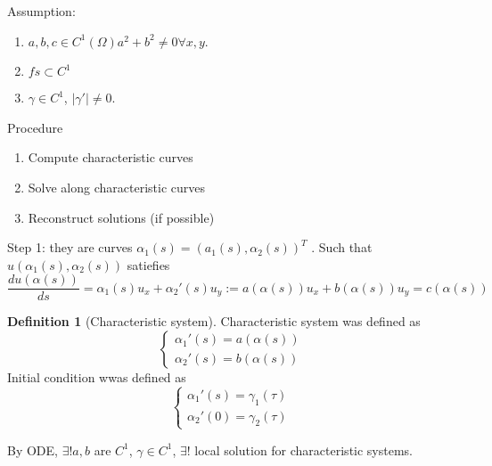 \documentclass[a4paper]{article}
\theoremstyle{definition}
\newtheorem{definition}{Definition}[section]
\begin{document}
	Assumption: \begin{enumerate}
		\item $a,b,c \in C^1\left( \Omega \right) a^2+b^2\neq 0 \forall x,y$. 
		\item $fs\subset C^{1}$
		\item $\gamma\in C^{1}$, $\left| \gamma' \right| \neq 0$.
	\end{enumerate}
	Procedure
	\begin{enumerate}
		\item Compute characteristic curves
		\item Solve along characteristic curves
		\item Reconstruct solutions (if possible)
	\end{enumerate}
	Step 1: they are curves $\alpha_1\left( s \right) =(a_1\left( s \right) ,\alpha_2\left( s \right) )^{T}$
	. Such that $u\left( \alpha_1\left( s \right) ,\alpha_2\left( s \right)  \right)  $ satiefies
	\begin{equation}
		\frac{du\left( \alpha\left( s \right)  \right) }{ds}=\alpha_1\left( s \right) u_x+\alpha_2'\left( s \right) u_y:=a\left( \alpha\left( s \right) \right)u_x+b\left( \alpha\left( s \right)  \right) u_y =c\left( \alpha\left( s \right)  \right)  
	\end{equation} 
	\begin{definition}[Characteristic system]
		Characteristic system was defined as 
		\begin{equation}
			\begin{cases}
				\alpha_1'\left( s \right) =a\left( \alpha\left( s \right)  \right) \\
				\alpha_2'\left( s \right)=b\left( \alpha\left( s \right)  \right)  
			\end{cases}
		\end{equation} 
		Initial condition wwas defined as 
		\begin{equation}
			\begin{cases}
			\alpha_1'\left( s \right) =\gamma_1\left( \tau \right) \\
			\alpha_2'\left( 0 \right)=\gamma_2\left( \tau\right)  
			\end{cases}
		\end{equation} 

	\end{definition}
		By ODE, $\exists ! a,b$ are $C^1$, $\gamma\in C^{1}$, $\exists  !$ local solution for characteristic systems. 
\end{document}
